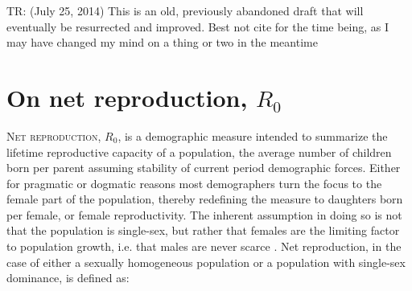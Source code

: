 \documentclass{article}
\begin{document}
TR: (July 25, 2014)
This is an old, previously abandoned draft that will eventually be resurrected
and improved. Best not cite for the time being, as I may have changed my mind on
a thing or two in the meantime 

\section*{On net reproduction, $R_{0}$}
\textsc{Net reproduction}, $R_{0}$, is a demographic measure intended to
summarize the lifetime reproductive capacity of a population, the average number
of children born per parent \citep{kuczynski1932fertility} assuming stability of
current period demographic forces. Either for pragmatic or dogmatic reasons most
demographers turn the focus to the female part of the population, thereby redefining the measure to daughters born per female, or female reproductivity. The inherent assumption in doing so is not that the population is single-sex, but rather that females are the limiting factor to population growth, i.e. that males are never scarce \citep{keyfitz2005applied}. Net reproduction, in the case of either a sexually homogeneous population or a population with single-sex dominance, is defined as:
\end{document}
